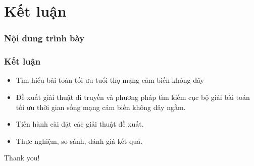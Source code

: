 \section{Kết luận}
\begin{frame}[noframenumbering]
    \frametitle{Nội dung trình bày}
    \tableofcontents[currentsection]
  \end{frame}

\begin{frame}
    \frametitle{Kết luận}

    \begin{itemize}
        \item Tìm hiểu bài toán tối ưu tuổi thọ mạng cảm biến không dây 
        \item Đề xuất giải thuật di truyền và phương pháp tìm kiếm cục bộ giải bài toán tối ưu thời gian sống mạng cảm biến không dây ngầm.
        \item Tiến hành cài đặt các giải thuật đề xuất.
        \item Thực nghiệm, so sánh, đánh giá kết quả.
    \end{itemize}
\end{frame}

\begin{frame}
    \Huge{\centerline{Thank you!}}
\end{frame}